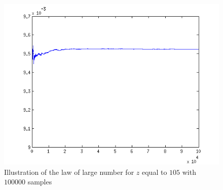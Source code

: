 \documentclass[a4paper]{article}
\begin{document}
\begin{figure}[!Hbt]
	\centering
	\includegraphics[scale=0.7]{z_105.png}
	\caption{Illustration of the law of large number for $z$ equal to $105$ with $100000$ samples}
	\label{fig:z_105}
\end{figure}
\end{document}
